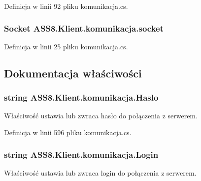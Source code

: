 Definicja w linii 92 pliku komunikacja.cs.\hypertarget{a00013_d521d29af9bd410a982fb72814ae1eb0}{
\subsubsection[{socket}]{\setlength{\rightskip}{0pt plus 5cm}Socket {\bf ASS8.Klient.komunikacja.socket}}}
\label{d7/dd4/a00013_d521d29af9bd410a982fb72814ae1eb0}




Definicja w linii 25 pliku komunikacja.cs.

\subsection{Dokumentacja właściwości}
\hypertarget{a00013_3c5917b1f8a0fb187d3c48ff22b25ec6}{
\subsubsection[{Haslo}]{\setlength{\rightskip}{0pt plus 5cm}string ASS8.Klient.komunikacja.Haslo}}
\label{d7/dd4/a00013_3c5917b1f8a0fb187d3c48ff22b25ec6}


Właściwość ustawia lub zwraca hasło do połączenia z serwerem. 



Definicja w linii 596 pliku komunikacja.cs.\hypertarget{a00013_2c321eee82dba3f82cae18a5b4d6d620}{
\subsubsection[{Login}]{\setlength{\rightskip}{0pt plus 5cm}string ASS8.Klient.komunikacja.Login}}
\label{d7/dd4/a00013_2c321eee82dba3f82cae18a5b4d6d620}


Właściwość ustawia lub zwraca login do połączenia z serwerem. 




